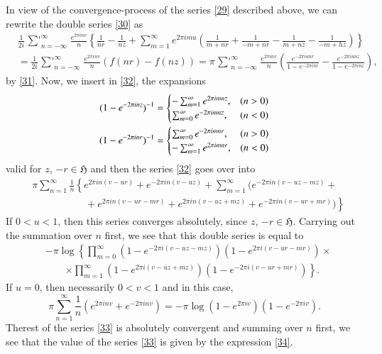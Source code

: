 In view of the convergence-process of the series \eqref{29} described\break
above, we can rewrite the double series \eqref{30} as
{\fontsize{9}{11}\selectfont
\begin{align*}
& \frac{1}{2i}\mathop{{\sum}'}^{\infty}_{n=-\infty}\frac{e^{2\pi
    inv}}{n}\left\{\frac{1}{nr}-\frac{1}{nz}+\sum^{\infty}_{m=1}e^{2\pi
  imu}\left(\frac{1}{m+nr}+\frac{1}{-m+nr}-\frac{1}{m+nz}-\frac{1}{-m+hz}\right)\right\}\\
& =\frac{1}{2i}\mathop{{\sum}'}^{\infty}_{n=-\infty}\frac{e^{2\pi
      inv}}{n}(f(nr)-f(nz))=\pi
  \mathop{{\sum}'}^{\infty}_{n=-\infty}\frac{e^{2\pi
      inv}}{n}\left(\frac{e^{-2\pi iunr}}{1-e^{-2\pi
      inr}}-\frac{e^{-2\pi iunz}}{1-e^{-2\pi
      inz}}\right),\tag{32}\label{32}
\end{align*}}\pageoriginale
by \eqref{31}. Now, we insert in \eqref{32}, the expansions
\begin{align*}\relax
(1-e^{-2\pi inz})^{-1} &=
\begin{cases}
-\sum^{\infty}_{m=1}e^{2\pi imnz}, & (n>0)\\
\sum^{\infty}_{m=0}e^{-2\pi imnz}, & (n<0)
\end{cases}\\
(1-e^{-2\pi inr})^{-1} &= 
\begin{cases}
\sum^{\infty}_{m=0}e^{-2\pi imnr}, & (n>0)\\
-\sum^{\infty}_{m=1}e^{2\pi imnr}, & (n<0)
\end{cases}
\end{align*}
valid for $z$, $-r\in \mathfrak{H}$ and then the series \eqref{32}
goes over into 
\begin{align*}
& \pi \sum^{\infty}_{n=1}\frac{1}{n}\left\{e^{2\pi in(v-ur)}+e^{-2\pi
  in(v-uz)}+\sum^{\infty}_{m=1}(e^{-2\pi in(v-uz-mz)}+\right.\\
& \qquad \left. \phantom{\sum^{\infty}_{m=1}} +e^{2\pi in(v-ur-mr)}+e^{2\pi
  in(v-uz+m z)}+e^{-2\pi in(v-ur+mr)})\right\}\tag{33}\label{33}
\end{align*}
If $0<u<1$, then this series converges absolutely, since $z$, $-r\in
\mathfrak{H}$. Carrying out the summation over $n$ first, we see that
this double series is equal to
\begin{align*}
& -\pi\log\left\{\prod^{\infty}_{m=0}(1-e^{-2\pi
    i(v-uz-mz)})(1-e^{2\pi i(v-ur-mr)})\times\right.\\
&\qquad \left. \times\prod^{\infty}_{m=1}(1-e^{2\pi
    i(v-uz+mz)})(1-e^{-2\pi i(v-ur+mr)})\right\}.\tag{34}\label{34}
\end{align*}
If $u=0$, then necessarily $0<v<1$ and in this case,
$$
\pi \sum^{\infty}_{n=1}\frac{1}{n}(e^{2\pi inv}+e^{-2\pi
  inv})=-\pi\log(1-e^{2\pi iv})(1-e^{-2\pi iv}). 
$$
The\pageoriginale rest of the series \eqref{33} is absolutely
convergent and summing over $n$ first, we see that the value of the
series \eqref{33} is given by the expression \eqref{34}.

